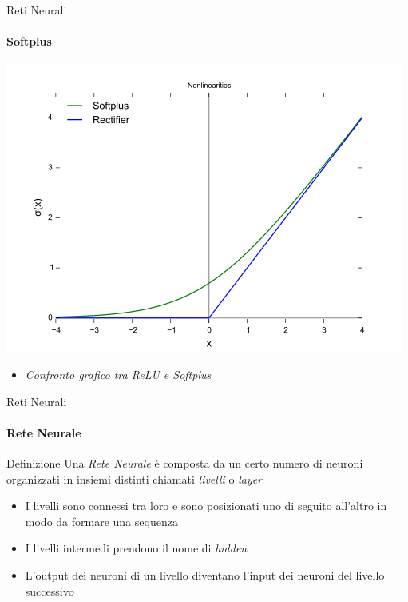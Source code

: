 \documentclass[
 ]{beamer}
\begin{document}
\begin{frame}{Reti Neurali}
    \framesubtitle{Softplus}
    
    \begin{center}
      \includegraphics[scale = 0.45]{softplus_vs_rectifier.png}
    \end{center}
  
    \smallskip
  
  \begin{itemize}
    \setlength\itemsep{1em}
    \item[] \large \emph{Confronto grafico tra ReLU e Softplus}
  \end{itemize}       
\end{frame} 

\begin{frame}{Reti Neurali}
    \framesubtitle{Rete Neurale}
    
    \begin{block}{Definizione} 
        \large Una \emph{Rete Neurale} è composta da un certo numero di neuroni organizzati in insiemi distinti chiamati \emph{livelli} o \emph{layer}
    \end{block}\pause
    
    \begin{itemize} [<+->]
        \setlength\itemsep{2em}
        \item \large I livelli sono connessi tra loro e sono posizionati uno di seguito all'altro in modo da formare una sequenza
        \item \large I livelli intermedi prendono il nome di \emph{hidden}
        \item \large L'output dei neuroni di un livello diventano l'input dei neuroni del livello successivo        
    \end{itemize}
\end{frame}
\end{document}
